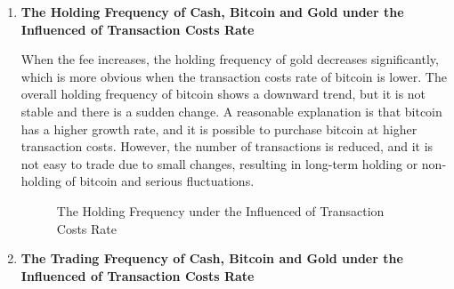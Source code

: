 \documentclass{mcmthesis}
\begin{document}
\begin{enumerate}
\item \textbf{The Holding Frequency of Cash, Bitcoin and Gold under the Influenced of Transaction Costs Rate}
\par When the fee increases, the holding frequency of gold decreases significantly, which is more obvious when the transaction costs rate of bitcoin is lower. The overall holding frequency of bitcoin shows a downward trend, but it is not stable and there is a sudden change. A reasonable explanation is that bitcoin has a higher growth rate, and it is possible to purchase bitcoin at higher transaction costs. However, the number of transactions is reduced, and it is not easy to trade due to small changes, resulting in long-term holding or non-holding of bitcoin and serious fluctuations.
\begin{figure}[htbp]    %
  \centering            %
  \caption{The Holding Frequency under the Influenced of Transaction Costs Rate}    %
  \label{fig:subfig_1}            %
\end{figure}

\item \textbf{The Trading Frequency of Cash, Bitcoin and Gold under the Influenced of Transaction Costs Rate}


\end{enumerate}
\end{document}
